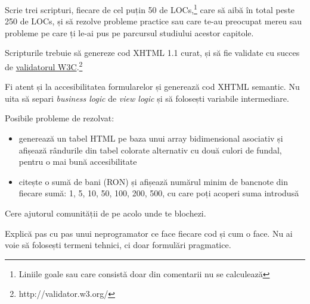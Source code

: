 \begin{Exercise}[title={Scrie scripturi}]

\ExePart

Scrie trei scripturi, fiecare de cel puțin 50 de
LOCs,\footnote{Liniile goale sau care consistă doar din comentarii nu se calculează}
care să aibă în total peste 250 de LOCs, și să rezolve probleme practice sau care
te-au preocupat mereu sau probleme pe care ți le-ai pus pe parcursul studiului acestor
capitole.

Scripturile trebuie să genereze cod XHTML 1.1 curat, și să fie
validate cu succes de \href{http://validator.w3.org/}{validatorul W3C}.\footnote{http://validator.w3.org/}

Fi atent și la accesibilitatea formularelor și generează cod XHTML semantic. Nu uita
să separi \textit{business logic} de
\textit{view logic} și să folosești variabile intermediare.

Posibile probleme de rezolvat:
\begin{itemize}
  \item generează un tabel HTML pe baza unui array bidimensional asociativ și afișează
rândurile din tabel colorate alternativ cu două culori de fundal, pentru o mai bună accesibilitate
  \item citește o sumă de bani (RON) și afișează numărul minim de bancnote din
fiecare sumă: 1, 5, 10, 50, 100, 200, 500, cu care poți acoperi suma introdusă
\end{itemize}

Cere ajutorul comunității de pe {\phpro} acolo unde te blochezi.

\ExePart

Explică pas cu pas unui neprogramator ce face fiecare cod și cum o face.
Nu ai voie să folosești termeni tehnici, ci doar formulări pragmatice.

\end{Exercise}
